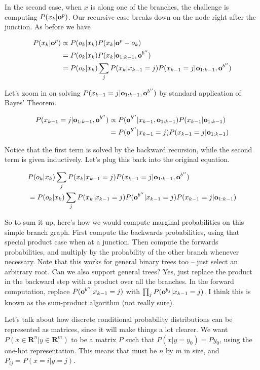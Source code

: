 \documentclass[12pt]{article}
\newcommand{\eq}[1]{\begin{align*}#1\end{align*}}
\begin{document}
In the second case, when $x$ is along one of the branches, the challenge is computing $P(x_k|\mathbf{o}^p)$. Our recursive case breaks down on the node right after the junction. As before we have

\eq{
  P(x_k|\o^p) &\propto P(o_k|x_k)P(x_k|\o^p - o_k) \\
  &= P(o_k|x_k)P(x_k|\o_{1:k-1}, \o^{b''}) \\
  &= P(o_k|x_k)\sum_j P(x_k|x_{k-1} = j)P(x_{k-1} = j|\o_{1:k-1}, \o^{b''}) \\
}

Let's zoom in on solving $P(x_{k-1} = j|\mathbf{o}_{1:k-1}, \mathbf{o}^{b''})$ by standard application of Bayes' Theorem.

\eq{
  P(x_{k-1} = j|\o_{1:k-1}, \o^{b''}) &\propto P(\o^{b''}|x_{k-1},\o_{1:k-1})P(x_{k-1}|\o_{1:k-1}) \\
  &= P(\o^{b''}|x_{k-1} = j)P(x_{k-1} = j|\o_{1:k-1})
}

Notice that the first term is solved by the backward recursion, while the second term is given inductively. Let's plug this back into the original equation.

\eq{
  &P(o_k|x_k)\sum_j P(x_k|x_{k-1} = j)P(x_{k-1} = j|\o_{1:k-1}, \o^{b''}) \\
  &= P(o_k|x_k)\sum_j P(x_k|x_{k-1} = j)P(\o^{b''}|x_{k-1} = j)P(x_{k-1} = j|\o_{1:k-1}) \\
}

So to sum it up, here's how we would compute marginal probabilities on this simple branch graph. First compute the backwards probabilities, using that special product case when at a junction. Then compute the forwards probabilities, and multiply by the probability of the other branch whenever necessary. Note that this works for general binary trees too -- just select an arbitrary root. Can we also support general trees? Yes, just replace the product in the backward step with a product over all the branches. In the forward computation, replace $P(\mathbf{o}^{b''}|x_{k-1} = j)$ with $\prod_j P(\mathbf{o}^{b_j}|x_{k-1} = j)$. I think this is known as the sum-product algorithm (not really sure).

\newcommand{\R}{\mathbf{R}}

Let's talk about how discrete conditional probability distributions can be represented as matrices, since it will make things a lot clearer. We want $P(x \in \R^n|y \in \R^m)$ to be a matrix $P$ such that $P(x|y = y_0) = Py_0$, using the one-hot representation. This means that must be $n$ by $m$ in size, and $P_{ij} = P(x = i | y = j)$.
\end{document}
